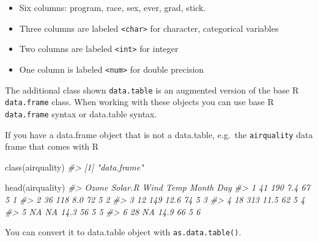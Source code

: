 \documentclass[
]{book}
\newenvironment{Shaded}{\begin{snugshade}}{\end{snugshade}}
\newcommand{\CommentTok}[1]{\textcolor[rgb]{0.56,0.35,0.01}{\textit{#1}}}
\newcommand{\FunctionTok}[1]{\textcolor[rgb]{0.00,0.00,0.00}{#1}}
\newcommand{\NormalTok}[1]{#1}
\providecommand{\tightlist}{%
  \setlength{\itemsep}{0pt}\setlength{\parskip}{0pt}}
\begin{document}
\begin{itemize}
\tightlist
\item
  Six columns: program, race, sex, ever, grad, stick.
\item
  Three columns are labeled \texttt{\textless{}char\textgreater{}} for character, categorical variables\\
\item
  Two columns are labeled \texttt{\textless{}int\textgreater{}} for integer
\item
  One column is labeled \texttt{\textless{}num\textgreater{}} for double precision
\end{itemize}

The additional class shown \texttt{data.table} is an augmented version of the base R \texttt{data.frame} class. When working with these objects you can use base R \texttt{data.frame} syntax or data.table syntax.

If you have a data.frame object that is not a data.table, e.g.~the \texttt{airquality} data frame that comes with R

\begin{Shaded}
\begin{Highlighting}[]
\FunctionTok{class}\NormalTok{(airquality)}
\CommentTok{\#\textgreater{} [1] "data.frame"}

\FunctionTok{head}\NormalTok{(airquality)}
\CommentTok{\#\textgreater{}   Ozone Solar.R Wind Temp Month Day}
\CommentTok{\#\textgreater{} 1    41     190  7.4   67     5   1}
\CommentTok{\#\textgreater{} 2    36     118  8.0   72     5   2}
\CommentTok{\#\textgreater{} 3    12     149 12.6   74     5   3}
\CommentTok{\#\textgreater{} 4    18     313 11.5   62     5   4}
\CommentTok{\#\textgreater{} 5    NA      NA 14.3   56     5   5}
\CommentTok{\#\textgreater{} 6    28      NA 14.9   66     5   6}
\end{Highlighting}
\end{Shaded}

You can convert it to data.table object with \texttt{as.data.table()}.
\end{document}
